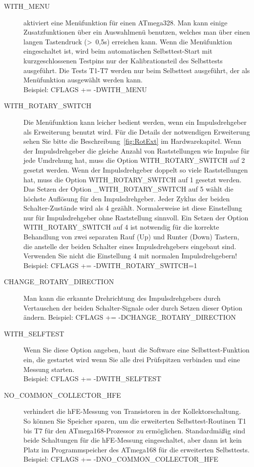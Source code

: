 \begin{description}
  \item[WITH\_MENU] aktiviert eine Menüfunktion für einen ATmega328. Man kann einige Zusatzfunktionen über ein
Auswahlmenü benutzen, welches man über einen langen Tastendruck (\textgreater~0,5s) erreichen kann.
Wenn die Menüfunktion eingeschaltet ist, wird beim automatischen Selbsttest-Start mit kurzgeschlossenen Testpins
 nur der Kalibrationsteil des Selbsttests ausgeführt.
Die Tests T1-T7 werden nur beim Selbsttest ausgeführt, der als Menüfunktion ausgewählt werden kann.\\
Beispiel: CFLAGS += -DWITH\_MENU

  \item[WITH\_ROTARY\_SWITCH] Die Menüfunktion kann leicher bedient werden, wenn ein Impulsdrehgeber als Erweiterung
benutzt wird.
Für die Details der notwendigen Erweiterung sehen Sie bitte die Beschreibung~\ref{fig:RotExt} im Hardwarekapitel.
Wenn der Impulsdrehgeber die gleiche Anzahl von Raststellungen wie Impulse für jede Umdrehung hat,
muss die Option WITH\_ROTARY\_SWITCH auf 2 gesetzt werden.
Wenn der Impulsdrehgeber doppelt so viele Raststellungen hat, muss die Option WITH\_ROTARY\_SWITCH auf 1 gesetzt werden.
Das Setzen der Option \_WITH\_ROTARY\_SWITCH auf 5 wählt die höchste Auflösung für den Impulsdrehgeber.
Jeder Zyklus der beiden Schalter-Zustände wird als 4 gezählt. Normalerweise ist diese Einstellung nur für
Impulsdrehgeber ohne Raststellung sinnvoll.
Ein Setzen der Option WITH\_ROTARY\_SWITCH auf 4 ist notwendig für die korrekte Behandlung von zwei separaten
Rauf (Up) und Runter (Down) Tastern, die anstelle der beiden Schalter eines Impulsdrehgebers eingebaut sind.
Verwenden Sie nicht die Einstellung 4 mit normalen Impulsdrehgebern!\\
Beispiel: CFLAGS += -DWITH\_ROTARY\_SWITCH=1

  \item[CHANGE\_ROTARY\_DIRECTION] Man kann die erkannte Drehrichtung des Impulsdrehgebers durch Vertauschen
der beiden Schalter-Signale oder durch Setzen dieser Option ändern.
Beispiel: CFLAGS += -DCHANGE\_ROTARY\_DIRECTION

 \item[WITH\_SELFTEST] Wenn Sie diese Option angeben, baut die Software eine Selbsttest-Funktion ein, die gestartet wird
wenn Sie alle drei Prüfspitzen verbinden und eine Messung starten.\\
Beispiel: CFLAGS += -DWITH\_SELFTEST

  \item[NO\_COMMON\_COLLECTOR\_HFE] verhindert die hFE-Messung von Transistoren in der Kollektorschaltung.
So können Sie Speicher sparen, um die erweiterten Selbsttest-Routinen T1 bis T7 für den ATmega168-Prozessor zu ermöglichen.
Standardmäßig sind beide Schaltungen für die hFE-Messung eingeschaltet,
aber dann ist kein Platz im Programmspeicher des ATmega168 für die erweiterten Selbsttests.\\
Beispiel: CFLAGS += -DNO\_COMMON\_COLLECTOR\_HFE


\end{description}
